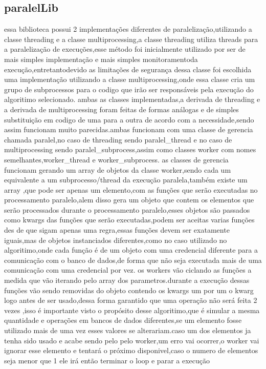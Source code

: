 \documentclass[
	12pt,				%
	openright,			%
	oneside,			%
	a4paper,			%
	english,			%
	french,				%
	spanish,			%
	brazil,				%
	]{abntex2}
\begin{document}
\subsection{paralelLib}
\label{subsec:paralelLib}
essa biblioteca possui 2 implementações diferentes de paralelização,utilizando a classe threading e a classe multiprocessing,a classe threading utiliza threads para a paralelização de execuções,esse método foi inicialmente utilizado por ser de mais simples implementação e mais simples monitoramentoda execução,entretantodevido as limitações de segurança dessa classe foi escolhida uma implementação utilizando a classe multiprocessing,onde essa classe cria um grupo de subprocessos para o codigo que irão ser responsáveis pela execução do algoritimo selecionado.
ambas as classes implementadas,a derivada de threading e a derivada de multiprocessing foram feitas de formas análogas e de simples substituição em codigo de uma para a outra de acordo com a necessidade,sendo assim funcionam muito parecidas.ambas funcionam com uma classe de gerencia chamada paralel,no caso de threading sendo paralel_thread e no caso de multiprocessing sendo paralel_subprocess,assim como classes worker com nomes semelhantes,worker_thread e worker_subprocess.
as classes de gerencia funcionam gerando um array de objetos da classe worker,sendo cada um equivalente a um subprocesso/thread da execução paralela,também existe um array ,que pode ser apenas um elemento,com as funções que serão executadas no processamento paralelo,alem disso gera um objeto que contem os elementos que serão processados durante o processamento paralelo,esses objetos são passados como kwargs das funções que serão executadas,podem ser aceitas varias funções des de que sigam apenas uma regra,essas funções devem ser exatamente iguais,mas de objetos instanciados diferentes,como no caso utilizado no algoritimo,onde cada função é de um objeto com uma credencial diferente para a comunicação com o banco de dados,de forma que não seja executada mais de uma comunicação com uma credencial por vez.
os workers vão ciclando as funções a medida que vão iterando pelo array dos parametros.durante a execução dessas funções vão sendo removidas do objeto contendo os kwargs um por um o kwarg logo antes de ser usado,dessa forma garantido que uma operação não será feita 2 vezes ,isso é importante visto o propósito desse algoritimo,que é simular a mesma quantidade e operações em bancos de dados diferentes,se um elemento fosse utilizado mais de uma vez esses valores se alterariam.caso um dos elementos ja tenha sido usado e acabe sendo pelo pelo worker,um erro vai ocorrer,o worker vai ignorar esse elemento e tentará o próximo disponivel,caso o numero de elementos seja menor que 1 ele irá então terminar o loop e parar a execução
\end{document}

